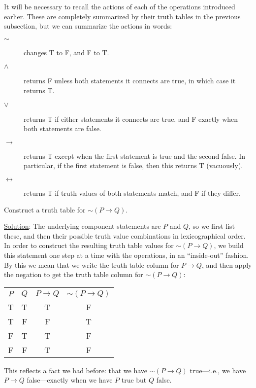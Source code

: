 It will be necessary to recall the actions of each of the
operations introduced earlier.  These are completely summarized
by their truth tables in the previous subsection, but
we can summarize the actions in words:
\begin{description}
\item[$\boldsymbol{\sim}$] changes T to F, and F to T.
\item[$\boldsymbol{\wedge}$] 
    returns F unless both statements it connects are true,
    in which case it returns T.
\item[$\boldsymbol{\vee}$] 
    returns T if either statements it connects are true, and
    F exactly when both statements are false.
\item[$\boldsymbol{\longrightarrow}$] 
    returns T except when the first statement
    is true and the second false.  In particular, if the
    first statement is false, then this returns T (vacuously).
\item[$\boldsymbol{\longleftrightarrow}$] 
    returns T if truth values of both statements
    match, and F if they differ.
\end{description}

 \bex Construct a truth table for $\sim(P\longrightarrow Q)$.
    
    \underline{Solution}: The underlying component statements are
$P$ and $Q$, so we first list these, and then their possible
truth value combinations in lexicographical order.  In
order to construct the resulting truth table values for
$\sim(P\longrightarrow Q)$, we build this statement one step
at a time with the operations, in an ``inside-out'' fashion.
By this we mean that we write the truth table column for
$P\longrightarrow Q$, and then apply the negation to get
the truth table column for $\sim(P\longrightarrow Q)$:
\begin{center}
\begin{tabular}{|c|c||c|c|}
\hline
$P$&$Q$&$P\longrightarrow Q$&$\sim(P\longrightarrow Q)$\\
\hline
T&T&T&F\\
T&F&F&T\\
F&T&T&F\\
F&F&T&F\\\hline
\end{tabular}
\end{center}
This reflects a fact we had before: that we
have $\sim(P\longrightarrow Q)$ true---i.e., we have
$P\longrightarrow Q$ false---exactly when we have
$P$ true but $Q$ false.\eex

